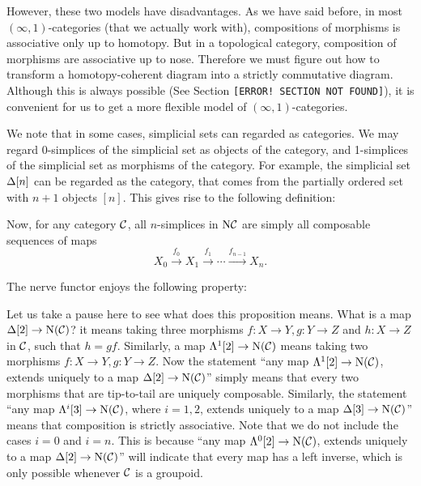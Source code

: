 However, these two models have disadvantages. As we have said before, in most $(\infty,1)$-categories (that we actually work with), compositions
of morphisms is associative only up to homotopy. But in a topological category, composition of morphisms are associative up to nose. 
Therefore we must figure out how to transform a homotopy-coherent diagram into a strictly commutative diagram. Although this is always
possible (See Section \texttt{\color{ff0000}[ERROR! SECTION NOT FOUND]}), it is convenient for us to get a more flexible model 
of $(\infty,1)$-categories.

We note that in some cases, simplicial sets can regarded as categories. We may regard 0-simplices of the simplicial set as objects of the category,
and 1-simplices of the simplicial set as morphisms of the category. For example, the simplicial set $\Delta[n]$ can be regarded as the category, 
that comes from the partially ordered set with $n+1$ objects $[n]$. This gives rise to the following definition:


Now, for any category $\mathcal{C}$, all $n$-simplices in $\mathrm{N}\mathcal{C}$ are simply all composable sequences of maps 
$$X_0\xrightarrow{f_0}X_1\xrightarrow{f_1}\cdots\xrightarrow{f_{n-1}}X_n.$$

The nerve functor enjoys the following property:


Let us take a pause here to see what does this proposition means. What is a map $\Delta[2]\to \mathrm{N}(\mathcal{C})$? it means taking three morphisms
$f:X\to Y,g:Y\to Z$ and $h:X\to Z$ in $\mathcal{C}$, such that $h=gf$. Similarly, a map $\Lambda^1[2]\to \mathrm{N}(\mathcal{C})$ means taking two morphisms 
$f:X\to Y,g:Y\to Z$. Now the statement ``any map $\Lambda^1[2]\to \mathrm{N}(\mathcal{C})$, extends uniquely to a map $\Delta[2]\to \mathrm{N}(\mathcal{C})$''
simply means that every two morphisms that are tip-to-tail are uniquely composable. Similarly, the statement ``any map $\Lambda^i[3]\to \mathrm{N}(\mathcal{C})$,
where $i=1,2$, extends uniquely to a map $\Delta[3]\to \mathrm{N}(\mathcal{C})$'' means that composition is strictly associative. Note that we do not
include the cases $i=0$ and $i=n$. This is because ``any map $\Lambda^0[2]\to \mathrm{N}(\mathcal{C})$, extends uniquely to a map $\Delta[2]\to \mathrm{N}(\mathcal{C})$''
will indicate that every map has a left inverse, which is only possible whenever $\mathcal{C}$ is a groupoid.

